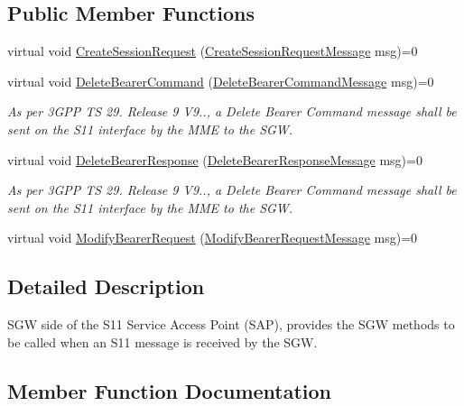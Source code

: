 \subsection*{Public Member Functions}
\begin{DoxyCompactItemize}
\item 
virtual void \hyperlink{classns3_1_1EpcS11SapSgw_a0e01ebe202d307f6b1d52884b66a8d96}{Create\+Session\+Request} (\hyperlink{structns3_1_1EpcS11SapSgw_1_1CreateSessionRequestMessage}{Create\+Session\+Request\+Message} msg)=0
\item 
virtual void \hyperlink{classns3_1_1EpcS11SapSgw_adce458b78927294e4c7b135b0c3c560c}{Delete\+Bearer\+Command} (\hyperlink{structns3_1_1EpcS11SapSgw_1_1DeleteBearerCommandMessage}{Delete\+Bearer\+Command\+Message} msg)=0
\begin{DoxyCompactList}\small\item\em As per 3\+G\+PP TS 29. Release 9 V9.., a Delete Bearer Command message shall be sent on the S11 interface by the M\+ME to the S\+GW. \end{DoxyCompactList}\item 
virtual void \hyperlink{classns3_1_1EpcS11SapSgw_a2f70f36b1e3847cbaeb18a8047a01c7d}{Delete\+Bearer\+Response} (\hyperlink{structns3_1_1EpcS11SapSgw_1_1DeleteBearerResponseMessage}{Delete\+Bearer\+Response\+Message} msg)=0
\begin{DoxyCompactList}\small\item\em As per 3\+G\+PP TS 29. Release 9 V9.., a Delete Bearer Command message shall be sent on the S11 interface by the M\+ME to the S\+GW. \end{DoxyCompactList}\item 
virtual void \hyperlink{classns3_1_1EpcS11SapSgw_a76232b4e3dd041237affd3c36d499646}{Modify\+Bearer\+Request} (\hyperlink{structns3_1_1EpcS11SapSgw_1_1ModifyBearerRequestMessage}{Modify\+Bearer\+Request\+Message} msg)=0
\end{DoxyCompactItemize}


\subsection{Detailed Description}
S\+GW side of the S11 Service Access Point (S\+AP), provides the S\+GW methods to be called when an S11 message is received by the S\+GW. 

\subsection{Member Function Documentation}
